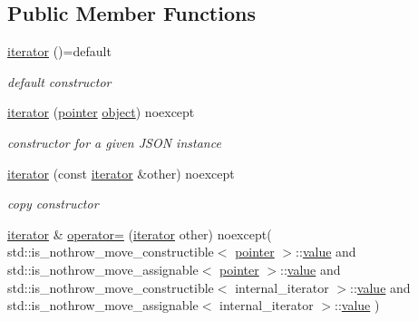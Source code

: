\subsection*{Public Member Functions}
\begin{DoxyCompactItemize}
\item 
\hyperlink{classnlohmann_1_1basic__json_1_1iterator_a47fb2dbbbfaf65c0ccfa99aeaed920a1}{iterator} ()=default
\begin{DoxyCompactList}\small\item\em default constructor \end{DoxyCompactList}\item 
\hyperlink{classnlohmann_1_1basic__json_1_1iterator_a085fe0d8cf459b5b1ae7b518b933ae7d}{iterator} (\hyperlink{classnlohmann_1_1basic__json_1_1const__iterator_a1da96fc3054d547e7706d3a2f073f389}{pointer} \hyperlink{classnlohmann_1_1basic__json_ad25b2f8c21e241e2d63455537a9294ff}{object}) noexcept
\begin{DoxyCompactList}\small\item\em constructor for a given J\+S\+ON instance \end{DoxyCompactList}\item 
\hyperlink{classnlohmann_1_1basic__json_1_1iterator_a1de0975e812c83e74d118b3e1063f335}{iterator} (const \hyperlink{classnlohmann_1_1basic__json_1_1iterator}{iterator} \&other) noexcept
\begin{DoxyCompactList}\small\item\em copy constructor \end{DoxyCompactList}\item 
\hyperlink{classnlohmann_1_1basic__json_1_1iterator}{iterator} \& \hyperlink{classnlohmann_1_1basic__json_1_1iterator_a3db892729714c4e7eaf60c00ee96e2e9}{operator=} (\hyperlink{classnlohmann_1_1basic__json_1_1iterator}{iterator} other) noexcept(                                       std\+::is\+\_\+nothrow\+\_\+move\+\_\+constructible$<$ \hyperlink{classnlohmann_1_1basic__json_1_1const__iterator_a1da96fc3054d547e7706d3a2f073f389}{pointer} $>$\+::\hyperlink{tk_8h_a177a0765f574ef6642002696d9cd82d0}{value} and                                       std\+::is\+\_\+nothrow\+\_\+move\+\_\+assignable$<$ \hyperlink{classnlohmann_1_1basic__json_1_1const__iterator_a1da96fc3054d547e7706d3a2f073f389}{pointer} $>$\+::\hyperlink{tk_8h_a177a0765f574ef6642002696d9cd82d0}{value} and                                       std\+::is\+\_\+nothrow\+\_\+move\+\_\+constructible$<$ internal\+\_\+iterator $>$\+::\hyperlink{tk_8h_a177a0765f574ef6642002696d9cd82d0}{value} and                                       std\+::is\+\_\+nothrow\+\_\+move\+\_\+assignable$<$ internal\+\_\+iterator $>$\+::\hyperlink{tk_8h_a177a0765f574ef6642002696d9cd82d0}{value}                       )

\end{DoxyCompactItemize}
